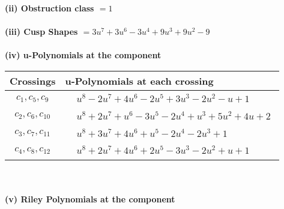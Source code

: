 \documentclass[1p]{elsarticle_modified}
\theoremstyle{definition}
\begin{document}
\flushleft \textbf{(ii) Obstruction class $= 1$}\\~\\
\flushleft \textbf{(iii) Cusp Shapes $= 3 u^7+3 u^6-3 u^4+9 u^3+9 u^2-9$}\\~\\
\newpage\renewcommand{\arraystretch}{1}
\flushleft \textbf{(iv) u-Polynomials at the component}\newline \\
\begin{tabular}{m{50pt}|m{274pt}}
Crossings & \hspace{64pt}u-Polynomials at each crossing \\
\hline $$\begin{aligned}c_{1},c_{5},c_{9}\end{aligned}$$&$\begin{aligned}
&u^8-2 u^7+4 u^6-2 u^5+3 u^3-2 u^2- u+1
\end{aligned}$\\
\hline $$\begin{aligned}c_{2},c_{6},c_{10}\end{aligned}$$&$\begin{aligned}
&u^8+2 u^7+u^6-3 u^5-2 u^4+u^3+5 u^2+4 u+2
\end{aligned}$\\
\hline $$\begin{aligned}c_{3},c_{7},c_{11}\end{aligned}$$&$\begin{aligned}
&u^8+3 u^7+4 u^6+u^5-2 u^4-2 u^3+1
\end{aligned}$\\
\hline $$\begin{aligned}c_{4},c_{8},c_{12}\end{aligned}$$&$\begin{aligned}
&u^8+2 u^7+4 u^6+2 u^5-3 u^3-2 u^2+u+1
\end{aligned}$\\
\hline
\end{tabular}\\~\\
\newpage\renewcommand{\arraystretch}{1}
\flushleft \textbf{(v) Riley Polynomials at the component}\newline \\
\end{document}
